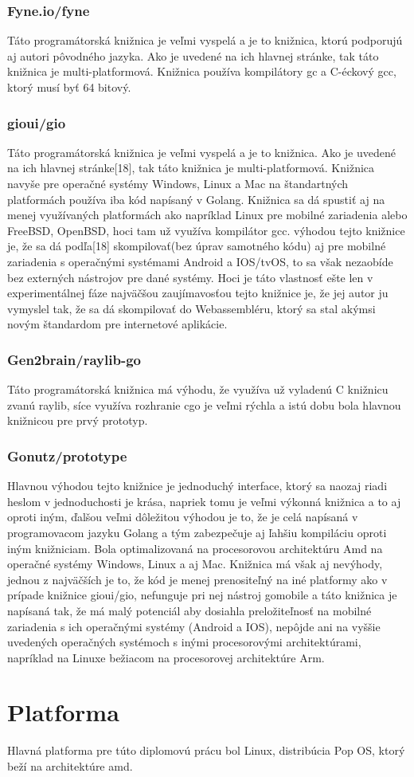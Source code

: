 \subsubsection{Fyne.io/fyne}
\tab[5 mm] Táto programátorská knižnica je veľmi vyspelá a je to knižnica, ktorú podporujú aj autori pôvodného jazyka. Ako je uvedené na ich hlavnej stránke\cite{GOlang5}, tak táto knižnica je multi-platformová. Knižnica používa kompilátory gc a C-éckový gcc, ktorý musí byť 64 bitový. 
\subsubsection{gioui/gio}
\tab[5 mm] Táto programátorská knižnica je veľmi vyspelá a je to knižnica. Ako je uvedené na ich hlavnej stránke[18], tak táto knižnica je multi-platformová. Knižnica navyše pre operačné systémy Windows, Linux a Mac na štandartných platformách používa iba kód napísaný v Golang. Knižnica sa dá spustiť aj na menej využívaných platformách ako napríklad Linux  pre mobilné zariadenia alebo FreeBSD, OpenBSD, hoci tam už využíva kompilátor gcc. výhodou tejto knižnice je, že sa dá podľa[18] skompilovať(bez úprav samotného kódu) aj pre mobilné zariadenia s operačnými systémami Android a IOS/tvOS, to sa však nezaobíde bez externých nástrojov pre dané systémy. Hoci je táto vlastnosť ešte len v experimentálnej fáze najväčšou zaujímavosťou tejto knižnice je, že jej autor ju vymyslel tak, že sa dá skompilovať do Webassembléru, ktorý sa stal akýmsi novým štandardom pre internetové aplikácie.
\subsubsection{Gen2brain/raylib-go }
\tab[5 mm] Táto programátorská knižnica má výhodu, že využíva už vyladenú C knižnicu zvanú raylib, síce využíva rozhranie cgo je veľmi rýchla a istú dobu bola hlavnou knižnicou pre prvý prototyp. 
\subsubsection{Gonutz/prototype}
\tab[5 mm] Hlavnou výhodou tejto knižnice je jednoduchý interface, ktorý sa naozaj riadi heslom v jednoduchosti je krása, napriek tomu je veľmi výkonná knižnica a to aj oproti iným, ďalšou veľmi dôležitou výhodou je to, že je celá napísaná v programovacom jazyku Golang a tým zabezpečuje aj ľahšiu kompiláciu oproti iným knižniciam. Bola optimalizovaná na procesorovou architektúru Amd na operačné systémy Windows, Linux a aj Mac. Knižnica má však aj nevýhody, jednou z najväčších je to, že kód je menej prenositeľný na iné platformy ako v prípade knižnice gioui/gio, nefunguje pri nej nástroj gomobile a táto knižnica je napísaná tak, že má malý potenciál aby dosiahla preložiteľnosť na mobilné zariadenia s ich operačnými systémy (Android a IOS), nepôjde ani na vyššie uvedených operačných systémoch s inými procesorovými architektúrami, napríklad na Linuxe bežiacom na procesorovej architektúre Arm.

\section{Platforma}
\tab[5 mm] Hlavná platforma pre túto diplomovú prácu bol Linux, distribúcia Pop OS, ktorý beží na architektúre amd.